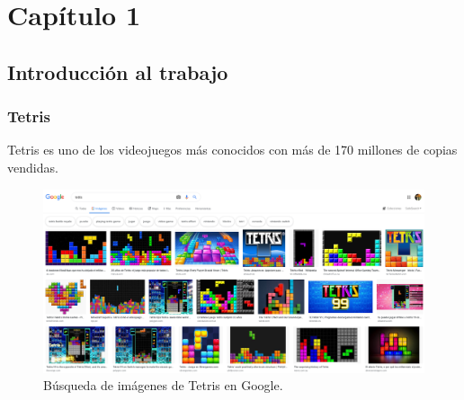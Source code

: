 \section{Capítulo 1}
\subsection{Introducción al trabajo}
 
\begin{frame}
\frametitle{Tetris}

Tetris es uno de los videojuegos más conocidos con más de 170 millones de copias vendidas.

\begin{figure}
\includegraphics[scale=0.15]{./images/tetris_search.png}
\caption{Búsqueda de imágenes de Tetris en Google.}
\end{figure}

\end{frame} 


